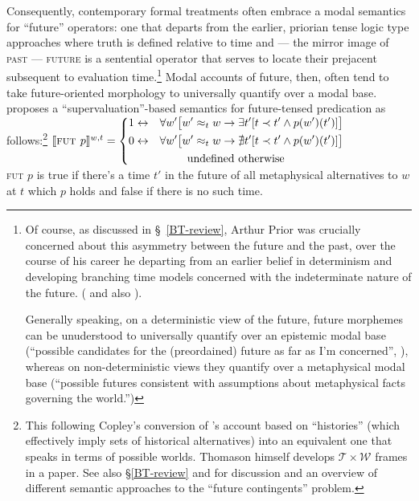 Consequently, contemporary formal treatments often embrace a modal semantics for ``future'' operators: one that departs from the earlier, priorian tense logic type approaches where truth is defined relative to time and --- the mirror image of \textsc{past} --- \textsc{future} is a sentential operator that serves to locate their prejacent subsequent to evaluation time.\footnote{Of course, as discussed in \S~\ref{BT-review}, Arthur Prior was crucially concerned about this asymmetry between the future and the past, over the course of his career he departing from an earlier belief in determinism and developing branching time models concerned with the indeterminate nature of the future. (\citealp[see][]{Copeland2020} and also \citealp[13]{Copley2009}).
	
	Generally speaking, on a deterministic view of the future, future morphemes can be unuderstood to universally quantify over an epistemic modal base (``possible candidates for the (preordained) future as far as I'm concerned'', \citealp[\textit{cf.}][]{Giannakidou2018}), whereas on non-deterministic views they quantify over a metaphysical modal base (``possible futures consistent with assumptions about metaphysical facts governing the world.'')} Modal accounts of future, then, often tend to take future-oriented morphology to universally quantify over a modal base. \citet[274]{Thomason1970} proposes a ``supervaluation''-based semantics for future-tensed predication as follows:\footnote{This following Copley's \citeyearpar[14]{Copley2009} conversion of \citeauthor{Thomason1970}'s account based on ``histories'' (which effectively imply sets of historical alternatives) into an equivalent one that speaks in terms of possible worlds. Thomason himself develops $ \mathcal{T\times W} $ frames in a \citeyear{Thomason1984} paper. See also \S\ref{BT-review} and \citep{Stojanovic2014} for discussion and an overview of different semantic approaches to the ``future contingents'' problem.}
\pex $ \denote[w,t]{\textsc{fut }p}=\left\{\begin{gathered}\begin{aligned} 1&\leftrightarrow &&\forall w'\big[w'\approx_t w \to\exists t' [t\prec t' \wedge p(w')(t')]\big]\\
0&\leftrightarrow &&\forall w'\big[w'\approx_t w \to\nexists t' [t\prec t' \wedge p(w')(t')]\big]
\end{aligned}\\
\text{undefined otherwise}\end{gathered}\right.
$\\[.5em]
\textsc{fut} $p$ is true if there's a time $ t' $ in the future of all metaphysical alternatives to $ w $ at $ t $ which $ p $ holds and false if there is no such time.\xe

